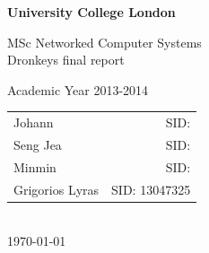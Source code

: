 \begin{titlepage}

\begin{center}
\begin{LARGE}\textbf{
University College London\\}\end{LARGE}
\vspace{2cm}
\begin{Large}
MSc Networked Computer Systems\\
Dronkeys final report\\
\end{Large}
\large{Academic Year 2013-2014}\\
\vfill
\begin{tabular}{l r}
\Large{Johann}&
\large{SID: }\\
\Large{Seng Jea}&
\large{SID: }\\
\Large{Minmin}&
\large{SID: }\\
\Large{Grigorios Lyras}&
\large{SID: 13047325}\\
\end{tabular}\\
\vspace{1cm}
\large\today\\
\end{center}
\end{titlepage}


